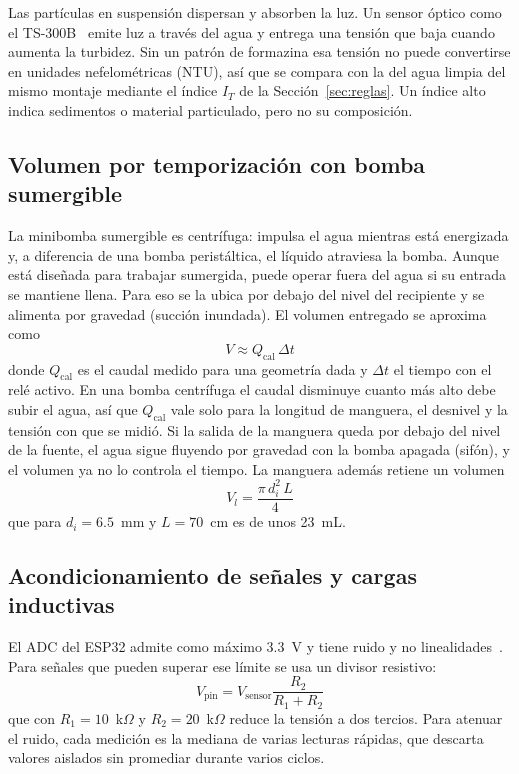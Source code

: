 Las partículas en suspensión dispersan y absorben la luz. Un sensor óptico como el TS-300B~\cite{ts300b} emite luz a través del agua y entrega una tensión que baja cuando aumenta la turbidez. Sin un patrón de formazina esa tensión no puede convertirse en unidades nefelométricas (NTU), así que se compara con la del agua limpia del mismo montaje mediante el índice $I_T$ de la Sección~\ref{sec:reglas}. Un índice alto indica sedimentos o material particulado, pero no su composición.

\subsection{Volumen por temporización con bomba sumergible}

La minibomba sumergible es centrífuga: impulsa el agua mientras está energizada y, a diferencia de una bomba peristáltica, el líquido atraviesa la bomba. Aunque está diseñada para trabajar sumergida, puede operar fuera del agua si su entrada se mantiene llena. Para eso se la ubica por debajo del nivel del recipiente y se alimenta por gravedad (succión inundada). El volumen entregado se aproxima como
\begin{equation}
    V \approx Q_{\text{cal}}\,\Delta t
\end{equation}
donde $Q_{\text{cal}}$ es el caudal medido para una geometría dada y $\Delta t$ el tiempo con el relé activo. En una bomba centrífuga el caudal disminuye cuanto más alto debe subir el agua, así que $Q_{\text{cal}}$ vale solo para la longitud de manguera, el desnivel y la tensión con que se midió. Si la salida de la manguera queda por debajo del nivel de la fuente, el agua sigue fluyendo por gravedad con la bomba apagada (sifón), y el volumen ya no lo controla el tiempo. La manguera además retiene un volumen
\begin{equation}
    V_l = \frac{\pi\,d_i^2\,L}{4}
\end{equation}
que para $d_i = 6.5$~mm y $L = 70$~cm es de unos 23~mL.

\subsection{Acondicionamiento de señales y cargas inductivas}

El ADC del ESP32 admite como máximo 3.3~V y tiene ruido y no linealidades~\cite{esp32}. Para señales que pueden superar ese límite se usa un divisor resistivo:
\begin{equation}
    V_{\text{pin}} = V_{\text{sensor}} \frac{R_2}{R_1 + R_2}
\end{equation}
que con $R_1 = 10$~k$\Omega$ y $R_2 = 20$~k$\Omega$ reduce la tensión a dos tercios. Para atenuar el ruido, cada medición es la mediana de varias lecturas rápidas, que descarta valores aislados sin promediar durante varios ciclos.

